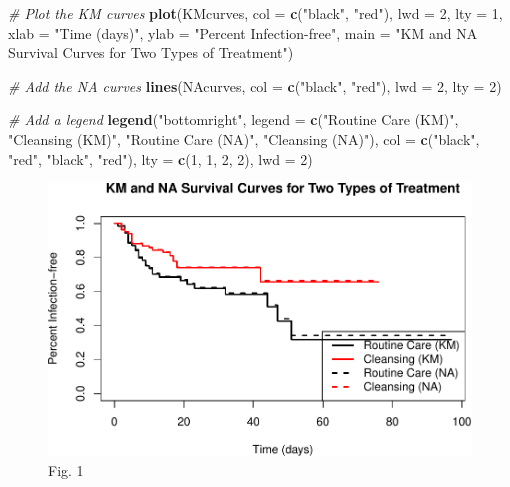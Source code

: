 \documentclass[12pt]{article}
\newenvironment{Shaded}{\begin{snugshade}}{\end{snugshade}}
\newcommand{\AttributeTok}[1]{\textcolor[rgb]{0.13,0.29,0.53}{#1}}
\newcommand{\CommentTok}[1]{\textcolor[rgb]{0.56,0.35,0.01}{\textit{#1}}}
\newcommand{\DecValTok}[1]{\textcolor[rgb]{0.00,0.00,0.81}{#1}}
\newcommand{\FunctionTok}[1]{\textcolor[rgb]{0.13,0.29,0.53}{\textbf{#1}}}
\newcommand{\NormalTok}[1]{#1}
\newcommand{\StringTok}[1]{\textcolor[rgb]{0.31,0.60,0.02}{#1}}
\begin{document}
\begin{Shaded}
\begin{Highlighting}[]
\CommentTok{\# Plot the KM curves}
\FunctionTok{plot}\NormalTok{(KMcurves, }\AttributeTok{col =} \FunctionTok{c}\NormalTok{(}\StringTok{"black"}\NormalTok{, }\StringTok{"red"}\NormalTok{), }\AttributeTok{lwd =} \DecValTok{2}\NormalTok{, }\AttributeTok{lty =} \DecValTok{1}\NormalTok{, }\AttributeTok{xlab =} \StringTok{"Time (days)"}\NormalTok{, }\AttributeTok{ylab =} \StringTok{"Percent Infection{-}free"}\NormalTok{, }
     \AttributeTok{main =} \StringTok{"KM and NA Survival Curves for Two Types of Treatment"}\NormalTok{)}

\CommentTok{\# Add the NA curves}
\FunctionTok{lines}\NormalTok{(NAcurves, }\AttributeTok{col =} \FunctionTok{c}\NormalTok{(}\StringTok{"black"}\NormalTok{, }\StringTok{"red"}\NormalTok{), }\AttributeTok{lwd =} \DecValTok{2}\NormalTok{, }\AttributeTok{lty =} \DecValTok{2}\NormalTok{)}

\CommentTok{\# Add a legend}
\FunctionTok{legend}\NormalTok{(}\StringTok{"bottomright"}\NormalTok{, }
       \AttributeTok{legend =} \FunctionTok{c}\NormalTok{(}\StringTok{"Routine Care (KM)"}\NormalTok{, }\StringTok{"Cleansing (KM)"}\NormalTok{, }\StringTok{"Routine Care (NA)"}\NormalTok{, }\StringTok{"Cleansing (NA)"}\NormalTok{),}
       \AttributeTok{col =} \FunctionTok{c}\NormalTok{(}\StringTok{"black"}\NormalTok{, }\StringTok{"red"}\NormalTok{, }\StringTok{"black"}\NormalTok{, }\StringTok{"red"}\NormalTok{), }
       \AttributeTok{lty =} \FunctionTok{c}\NormalTok{(}\DecValTok{1}\NormalTok{, }\DecValTok{1}\NormalTok{, }\DecValTok{2}\NormalTok{, }\DecValTok{2}\NormalTok{), }
       \AttributeTok{lwd =} \DecValTok{2}\NormalTok{)}
\end{Highlighting}
\end{Shaded}

\begin{figure}
\centering
\includegraphics{Survival-Analysis-of-Infection-Control-Measures-in-Burn-Patients_files/figure-latex/fig1-1.pdf}
\caption{Fig. 1}
\end{figure}
\end{document}
